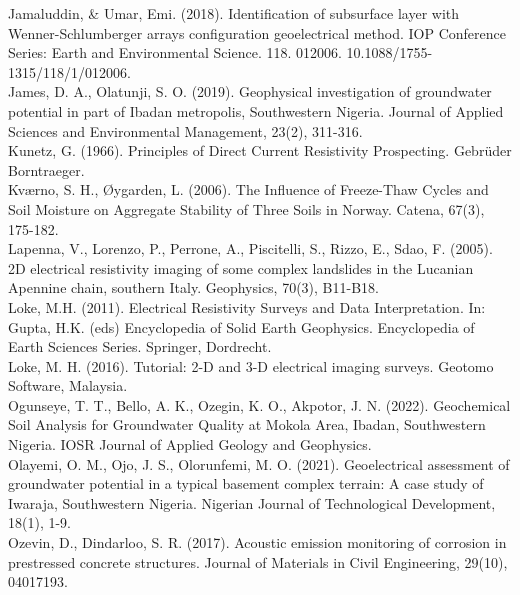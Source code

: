 \documentclass[12pt,a4paper]{report}
\begin{document}
\begin{justify}
    Jamaluddin, \& Umar, Emi. (2018). Identification of subsurface layer with Wenner-Schlumberger arrays configuration geoelectrical method. IOP Conference Series: Earth and Environmental Science. 118. 012006. 10.1088/1755-1315/118/1/012006. \\

    James, D. A., Olatunji, S. O. (2019). Geophysical investigation of groundwater potential in part of Ibadan metropolis, Southwestern Nigeria. Journal of Applied Sciences and Environmental Management, 23(2), 311-316. \\
    
    Kunetz, G. (1966). Principles of Direct Current Resistivity Prospecting. Gebrüder Borntraeger. \\
    
    Kværno, S. H., Øygarden, L. (2006). The Influence of Freeze-Thaw Cycles and Soil Moisture on Aggregate Stability of Three Soils in Norway. Catena, 67(3), 175-182. \\
    
    Lapenna, V., Lorenzo, P., Perrone, A., Piscitelli, S., Rizzo, E., Sdao, F. (2005). 2D electrical resistivity imaging of some complex landslides in the Lucanian Apennine chain, southern Italy. Geophysics, 70(3), B11-B18. \\
    
    Loke, M.H. (2011). Electrical Resistivity Surveys and Data Interpretation. In: Gupta, H.K. (eds) Encyclopedia of Solid Earth Geophysics. Encyclopedia of Earth Sciences Series. Springer, Dordrecht. \\

    Loke, M. H. (2016). Tutorial: 2-D and 3-D electrical imaging surveys. Geotomo Software, Malaysia. \\
        
    Ogunseye, T. T., Bello, A. K., Ozegin, K. O., Akpotor, J. N. (2022). Geochemical Soil Analysis for Groundwater Quality at Mokola Area, Ibadan, Southwestern Nigeria. IOSR Journal of Applied Geology and Geophysics. \\
    
    Olayemi, O. M., Ojo, J. S., Olorunfemi, M. O. (2021). Geoelectrical assessment of groundwater potential in a typical basement complex terrain: A case study of Iwaraja, Southwestern Nigeria. Nigerian Journal of Technological Development, 18(1), 1-9. \\
    
    Ozevin, D., Dindarloo, S. R. (2017). Acoustic emission monitoring of corrosion in prestressed concrete structures. Journal of Materials in Civil Engineering, 29(10), 04017193. \\
    

\end{justify}
\end{document}
